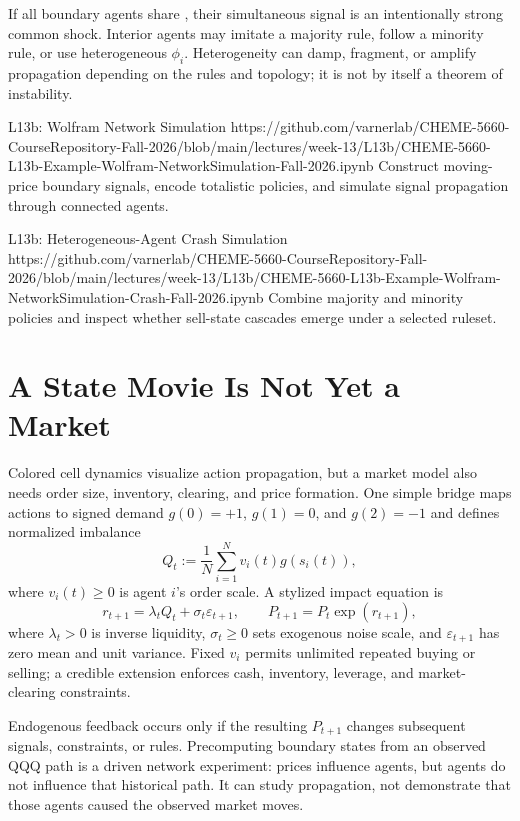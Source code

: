 \documentclass[11pt]{article}
\begin{document}
If all boundary agents share , their simultaneous signal is an intentionally strong common shock. Interior agents may imitate a majority rule, follow a minority rule, or use heterogeneous $\phi_i$. Heterogeneity can damp, fragment, or amplify propagation depending on the rules and topology; it is not by itself a theorem of instability.

\notebooklink
  {L13b: Wolfram Network Simulation}
  {https://github.com/varnerlab/CHEME-5660-CourseRepository-Fall-2026/blob/main/lectures/week-13/L13b/CHEME-5660-L13b-Example-Wolfram-NetworkSimulation-Fall-2026.ipynb}
  {Construct moving-price boundary signals, encode totalistic policies, and simulate signal propagation through connected agents.}

\notebooklink
  {L13b: Heterogeneous-Agent Crash Simulation}
  {https://github.com/varnerlab/CHEME-5660-CourseRepository-Fall-2026/blob/main/lectures/week-13/L13b/CHEME-5660-L13b-Example-Wolfram-NetworkSimulation-Crash-Fall-2026.ipynb}
  {Combine majority and minority policies and inspect whether sell-state cascades emerge under a selected ruleset.}

\section{A State Movie Is Not Yet a Market}

Colored cell dynamics visualize action propagation, but a market model also needs order size, inventory, clearing, and price formation. One simple bridge maps actions to signed demand $g(0)=+1$, $g(1)=0$, and $g(2)=-1$ and defines normalized imbalance
\begin{equation}
  \label{eq:imbalance}
  Q_t:=\frac{1}{N}\sum_{i=1}^{N}v_i(t)g(s_i(t)),
\end{equation}
where $v_i(t)\geq0$ is agent $i$'s order scale. A stylized impact equation is
\begin{equation}
  \label{eq:price-impact}
  r_{t+1}=\lambda_t Q_t+\sigma_t\varepsilon_{t+1},
  \qquad
  P_{t+1}=P_t\exp(r_{t+1}),
\end{equation}
where $\lambda_t>0$ is inverse liquidity, $\sigma_t\geq0$ sets exogenous noise scale, and $\varepsilon_{t+1}$ has zero mean and unit variance. Fixed $v_i$ permits unlimited repeated buying or selling; a credible extension enforces cash, inventory, leverage, and market-clearing constraints.

Endogenous feedback occurs only if the resulting $P_{t+1}$ changes subsequent signals, constraints, or rules. Precomputing boundary states from an observed QQQ path is a driven network experiment: prices influence agents, but agents do not influence that historical path. It can study propagation, not demonstrate that those agents caused the observed market moves.
\end{document}
